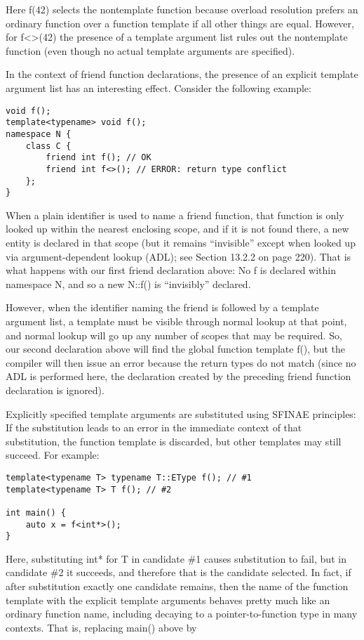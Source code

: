 Here f(42) selects the nontemplate function because overload resolution prefers an ordinary function over a function template if all other things are equal. However, for f<>(42) the presence of a template argument list rules out the nontemplate function (even though no actual template arguments are specified).

In the context of friend function declarations, the presence of an explicit template argument list has an interesting effect. Consider the following example:

\begin{lstlisting}[style=styleCXX]
void f();
template<typename> void f();
namespace N {
	class C {
		friend int f(); // OK
		friend int f<>(); // ERROR: return type conflict
	};
}
\end{lstlisting}

When a plain identifier is used to name a friend function, that function is only looked up within the nearest enclosing scope, and if it is not found there, a new entity is declared in that scope (but it remains “invisible” except when looked up via argument-dependent lookup (ADL); see Section 13.2.2 on page 220). That is what happens with our first friend declaration above: No f is declared within namespace N, and so a new N::f() is “invisibly” declared.

However, when the identifier naming the friend is followed by a template argument list, a template must be visible through normal lookup at that point, and normal lookup will go up any number of scopes that may be required. So, our second declaration above will find the global function template f(), but the compiler will then issue an error because the return types do not match (since no ADL is performed here, the declaration created by the preceding friend function declaration is ignored).

Explicitly specified template arguments are substituted using SFINAE principles: If the substitution leads to an error in the immediate context of that substitution, the function template is discarded, but other templates may still succeed. For example:

\begin{lstlisting}[style=styleCXX]
template<typename T> typename T::EType f(); // #1
template<typename T> T f(); // #2

int main() {
	auto x = f<int*>();
}
\end{lstlisting}

Here, substituting int* for T in candidate \#1 causes substitution to fail, but in candidate \#2 it succeeds, and therefore that is the candidate selected. In fact, if after substitution exactly one candidate remains, then the name of the function template with the explicit template arguments behaves pretty much like an ordinary function name, including decaying to a pointer-to-function type in many contexts. That is, replacing main() above by


